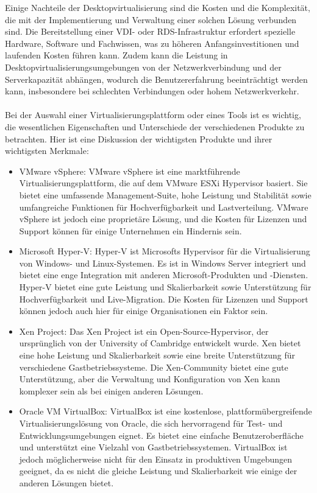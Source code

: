 Einige Nachteile der Desktopvirtualisierung sind die Kosten und die Komplexität, die mit der Implementierung und Verwaltung einer solchen Lösung verbunden sind. Die Bereitstellung einer VDI- oder RDS-Infrastruktur erfordert spezielle Hardware, Software und Fachwissen, was zu höheren Anfangsinvestitionen und laufenden Kosten führen kann. Zudem kann die Leistung in Desktopvirtualisierungsumgebungen von der Netzwerkverbindung und der Serverkapazität abhängen, wodurch die Benutzererfahrung beeinträchtigt werden kann, insbesondere bei schlechten Verbindungen oder hohem Netzwerkverkehr.
\\\\
Bei der Auswahl einer Virtualisierungsplattform oder eines Tools ist es wichtig, die wesentlichen Eigenschaften und Unterschiede der verschiedenen Produkte zu betrachten. Hier ist eine Diskussion der wichtigsten Produkte und ihrer wichtigsten Merkmale:
\begin{itemize}
\item VMware vSphere: VMware vSphere ist eine marktführende Virtualisierungsplattform, die auf dem VMware ESXi Hypervisor basiert. Sie bietet eine umfassende Management-Suite, hohe Leistung und Stabilität sowie umfangreiche Funktionen für Hochverfügbarkeit und Lastverteilung. VMware vSphere ist jedoch eine proprietäre Lösung, und die Kosten für Lizenzen und Support können für einige Unternehmen ein Hindernis sein.
\item Microsoft Hyper-V: Hyper-V ist Microsofts Hypervisor für die Virtualisierung von Windows- und Linux-Systemen. Es ist in Windows Server integriert und bietet eine enge Integration mit anderen Microsoft-Produkten und -Diensten. Hyper-V bietet eine gute Leistung und Skalierbarkeit sowie Unterstützung für Hochverfügbarkeit und Live-Migration. Die Kosten für Lizenzen und Support können jedoch auch hier für einige Organisationen ein Faktor sein.
\item Xen Project: Das Xen Project ist ein Open-Source-Hypervisor, der ursprünglich von der University of Cambridge entwickelt wurde. Xen bietet eine hohe Leistung und Skalierbarkeit sowie eine breite Unterstützung für verschiedene Gastbetriebssysteme. Die Xen-Community bietet eine gute Unterstützung, aber die Verwaltung und Konfiguration von Xen kann komplexer sein als bei einigen anderen Lösungen.
\item Oracle VM VirtualBox: VirtualBox ist eine kostenlose, plattformübergreifende Virtualisierungslösung von Oracle, die sich hervorragend für Test- und Entwicklungsumgebungen eignet. Es bietet eine einfache Benutzeroberfläche und unterstützt eine Vielzahl von Gastbetriebssystemen. VirtualBox ist jedoch möglicherweise nicht für den Einsatz in produktiven Umgebungen geeignet, da es nicht die gleiche Leistung und Skalierbarkeit wie einige der anderen Lösungen bietet.
\end{itemize}

